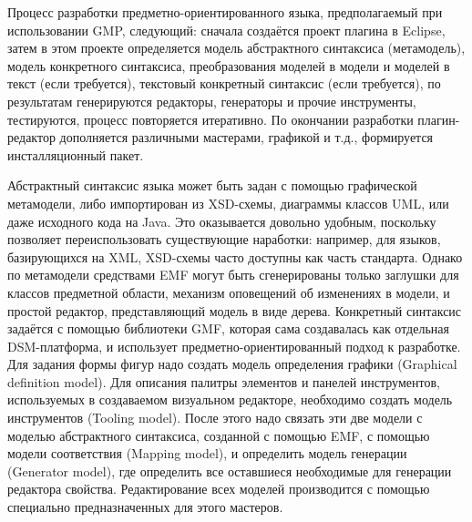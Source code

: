Процесс разработки предметно-ориентированного языка, предполагаемый при использовании GMP, 
следующий: сначала создаётся проект плагина в Eclipse, затем в этом проекте определяется 
модель абстрактного синтаксиса (метамодель), модель конкретного синтаксиса, преобразования 
моделей в модели и моделей в текст (если требуется), текстовый конкретный синтаксис 
(если требуется), по результатам генерируются редакторы, генераторы и прочие инструменты, 
тестируются, процесс повторяется итеративно. По окончании разработки плагин-редактор 
дополняется различными мастерами, графикой и т.д., формируется инсталляционный пакет.

Абстрактный синтаксис языка может быть задан с помощью графической метамодели, либо 
импортирован из XSD-схемы, диаграммы классов UML, или даже исходного кода на Java. 
Это оказывается довольно удобным, поскольку позволяет переиспользовать существующие 
наработки: например, для языков, базирующихся на XML, XSD-схемы часто доступны как 
часть стандарта. Однако по метамодели средствами EMF могут быть сгенерированы только 
заглушки для классов предметной области, механизм оповещений об изменениях в модели, 
и простой редактор, представляющий модель в виде дерева. Конкретный синтаксис задаётся
с помощью библиотеки GMF, которая сама создавалась как отдельная DSM-платформа, и использует 
предметно-ориентированный подход к разработке. Для задания формы фигур надо создать 
модель определения графики (Graphical definition model). Для описания палитры элементов 
и панелей инструментов, используемых в создаваемом визуальном редакторе, необходимо 
создать модель инструментов (Tooling model). После этого надо связать эти две модели 
с моделью абстрактного синтаксиса, созданной с помощью EMF, с помощью модели соответствия 
(Mapping model), и определить модель генерации (Generator model), где определить все 
оставшиеся необходимые для генерации редактора свойства. Редактирование всех моделей 
производится с помощью специально предназначенных для этого мастеров.


